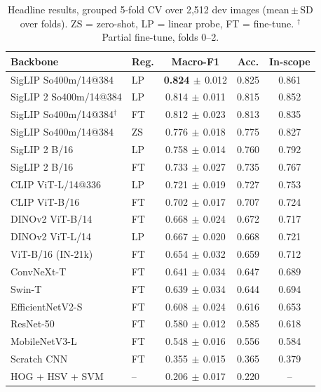 \documentclass[conference]{IEEEtran}
\newcommand{\pmsd}[2]{#1{\scriptsize$\,\pm\,$#2}}
\begin{document}
\begin{table}[t]
\centering\footnotesize
\caption{Headline results, grouped 5-fold CV over 2,512 dev images (mean\,$\pm$\,SD over folds). ZS = zero-shot,
LP = linear probe, FT = fine-tune. $^\dagger$Partial fine-tune, folds 0--2.}
\label{tab:bench}
\begin{tabular}{@{}llccc@{}}
\toprule
Backbone & Reg. & Macro-F1 & Acc. & In-scope \\
\midrule
SigLIP So400m/14@384 & LP & \pmsd{\textbf{0.824}}{0.012} & 0.825 & 0.861 \\
SigLIP 2 So400m/14@384 & LP & \pmsd{0.814}{0.011} & 0.815 & 0.852 \\
SigLIP So400m/14@384$^\dagger$ & FT & \pmsd{0.812}{0.023} & 0.813 & 0.835 \\
SigLIP So400m/14@384 & ZS & \pmsd{0.776}{0.018} & 0.775 & 0.827 \\
SigLIP 2 B/16 & LP & \pmsd{0.758}{0.014} & 0.760 & 0.792 \\
SigLIP 2 B/16 & FT & \pmsd{0.733}{0.027} & 0.735 & 0.767 \\
CLIP ViT-L/14@336 & LP & \pmsd{0.721}{0.019} & 0.727 & 0.753 \\
CLIP ViT-B/16 & FT & \pmsd{0.702}{0.017} & 0.707 & 0.724 \\
DINOv2 ViT-B/14 & FT & \pmsd{0.668}{0.024} & 0.672 & 0.717 \\
DINOv2 ViT-L/14 & LP & \pmsd{0.667}{0.020} & 0.668 & 0.721 \\
ViT-B/16 (IN-21k) & FT & \pmsd{0.654}{0.032} & 0.659 & 0.712 \\
ConvNeXt-T & FT & \pmsd{0.641}{0.034} & 0.647 & 0.689 \\
Swin-T & FT & \pmsd{0.639}{0.034} & 0.644 & 0.694 \\
EfficientNetV2-S & FT & \pmsd{0.608}{0.024} & 0.616 & 0.653 \\
ResNet-50 & FT & \pmsd{0.580}{0.012} & 0.585 & 0.618 \\
MobileNetV3-L & FT & \pmsd{0.548}{0.016} & 0.556 & 0.584 \\
Scratch CNN & FT & \pmsd{0.355}{0.015} & 0.365 & 0.379 \\
HOG + HSV + SVM & -- & \pmsd{0.206}{0.017} & 0.220 & -- \\
\bottomrule
\end{tabular}
\end{table}
\end{document}
